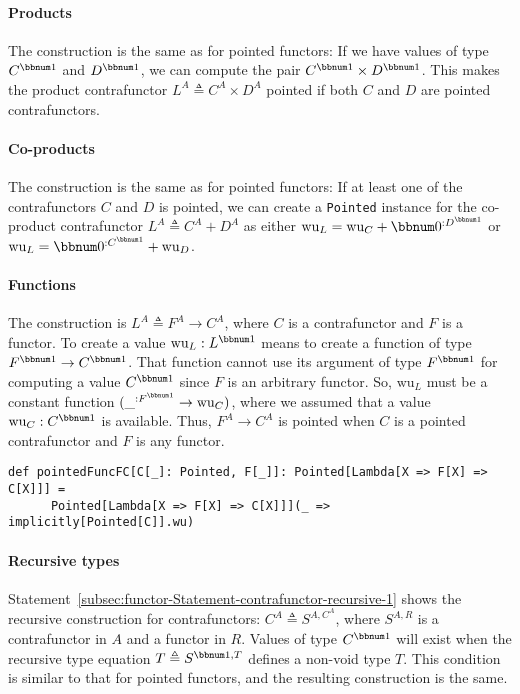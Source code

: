 \paragraph{Products}

The construction is the same as for pointed functors: If we have values
of type $C^{\bbnum 1}$ and $D^{\bbnum 1}$, we can compute the pair
$C^{\bbnum 1}\times D^{\bbnum 1}$. This makes the product contrafunctor
$L^{A}\triangleq C^{A}\times D^{A}$ pointed if both $C$ and $D$
are pointed contrafunctors.

\paragraph{Co-products}

The construction is the same as for pointed functors: If at least
one of the contrafunctors $C$ and $D$ is pointed, we can create
a \lstinline!Pointed! instance for the co-product contrafunctor $L^{A}\triangleq C^{A}+D^{A}$
as either $\text{wu}_{L}=\text{wu}_{C}+\bbnum 0^{:D^{\bbnum 1}}$
or $\text{wu}_{L}=\bbnum 0^{:C^{\bbnum 1}}+\text{wu}_{D}$.

\paragraph{Functions}

The construction is $L^{A}\triangleq F^{A}\rightarrow C^{A}$, where
$C$ is a contrafunctor and $F$ is a functor. To create a value $\text{wu}_{L}:L^{\bbnum 1}$
means to create a function of type $F^{\bbnum 1}\rightarrow C^{\bbnum 1}$.
That function cannot use its argument of type $F^{\bbnum 1}$ for
computing a value $C^{\bbnum 1}$ since $F$ is an arbitrary functor.
So, $\text{wu}_{L}$ must be a constant function $(\_^{:F^{\bbnum 1}}\rightarrow\text{wu}_{C})$,
where we assumed that a value $\text{wu}_{C}:C^{\bbnum 1}$ is available.
Thus, $F^{A}\rightarrow C^{A}$ is pointed when $C$ is a pointed
contrafunctor and $F$ is any functor.
\begin{lstlisting}
def pointedFuncFC[C[_]: Pointed, F[_]]: Pointed[Lambda[X => F[X] => C[X]]] =
      Pointed[Lambda[X => F[X] => C[X]]](_ => implicitly[Pointed[C]].wu)
\end{lstlisting}


\paragraph{Recursive types}

Statement~\ref{subsec:functor-Statement-contrafunctor-recursive-1}
shows the recursive construction for contrafunctors: $C^{A}\triangleq S^{A,C^{A}}$,
where $S^{A,R}$ is a contrafunctor in $A$ and a functor in $R$.
Values of type $C^{\bbnum 1}$ will exist when the recursive type
equation $T\triangleq S^{\bbnum 1,T}$ defines a non-void type $T$.
This condition is similar to that for pointed functors, and the resulting
construction is the same.

